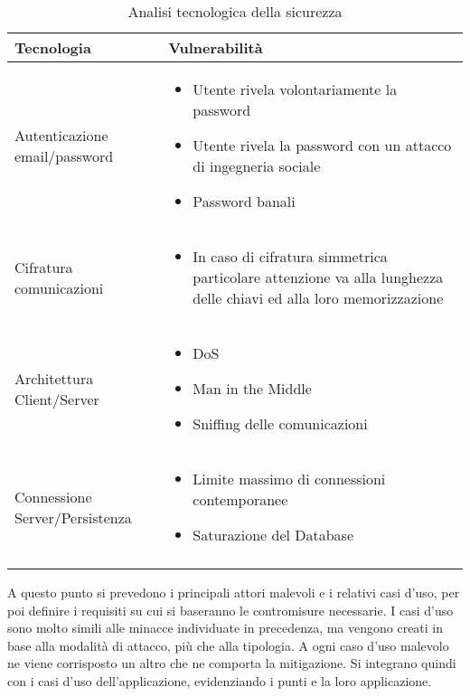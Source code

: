 \begin{longtable} {|P{4cm}|P{12cm}|}
    \hline
    Tecnologia                     & Vulnerabilità                                                                         \\
    \hline
    \endhead
    Autenticazione email/password  &
    \begin{itemize}
        \item Utente rivela volontariamente la password
        \item Utente rivela la password con un attacco di ingegneria sociale
        \item Password banali
    \end{itemize}                                                    \\
    \hline
    Cifratura comunicazioni        &
    \begin{itemize}
        \item In caso di cifratura simmetrica particolare attenzione va alla lunghezza delle chiavi ed alla loro memorizzazione
    \end{itemize} \\
    \hline
    Architettura Client/Server     &
    \begin{itemize}
        \item DoS
        \item Man in the Middle
        \item Sniffing delle comunicazioni
    \end{itemize}                                                                                      \\
    \hline
    Connessione Server/Persistenza & \begin{itemize}
                                         \item Limite massimo di connessioni contemporanee
                                         \item Saturazione del Database
                                     \end{itemize}                                      \\
    \hline
    \caption{Analisi tecnologica della sicurezza}
\end{longtable}

A questo punto si prevedono i principali attori malevoli e i relativi casi d'uso,
per poi definire i requisiti su cui si baseranno le contromisure necessarie.
I casi d'uso sono molto simili alle minacce individuate in precedenza,
ma vengono creati in base alla modalità di attacco, più che alla tipologia.
A ogni caso d'uso malevolo ne viene corrisposto un altro che ne comporta la mitigazione.
Si integrano quindi con i casi d'uso dell'applicazione,
evidenziando i punti e la loro applicazione.\\
\clearpage

